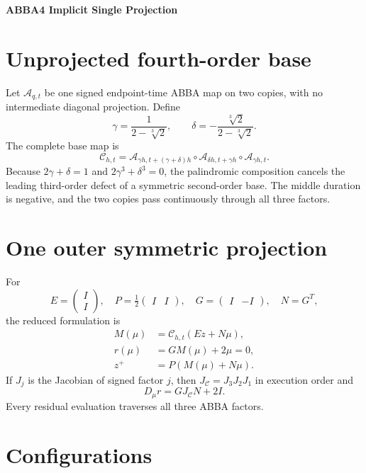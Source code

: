 \documentclass[11pt,a4paper]{article}
\begin{document}
\begin{center}
 {\LARGE\bfseries\color{gcblue}ABBA4 Implicit Single Projection}\par
 \vspace{0.35em}{\large One symmetric projection around an unprojected triple jump}
\end{center}

\section{Unprojected fourth-order base}

Let $\mathcal A_{q,t}$ be one signed endpoint-time ABBA map on two copies,
with no intermediate diagonal projection.  Define
\[
\gamma=\frac{1}{2-\sqrt[3]{2}},\qquad
\delta=-\frac{\sqrt[3]{2}}{2-\sqrt[3]{2}}.
\]
The complete base map is
\[
\mathcal C_{h,t}=
\mathcal A_{\gamma h,t+(\gamma+\delta)h}
\circ\mathcal A_{\delta h,t+\gamma h}
\circ\mathcal A_{\gamma h,t}.
\]
Because $2\gamma+\delta=1$ and $2\gamma^3+\delta^3=0$, the palindromic
composition cancels the leading third-order defect of a symmetric second-order
base.  The middle duration is negative, and the two copies pass continuously
through all three factors.

\section{One outer symmetric projection}

For
\[
E=\begin{pmatrix}I\\I\end{pmatrix},\quad
P=\tfrac12\begin{pmatrix}I&I\end{pmatrix},\quad
G=\begin{pmatrix}I&-I\end{pmatrix},\quad N=G^T,
\]
the reduced formulation is
\begin{align}
M(\mu)&=\mathcal C_{h,t}(Ez+N\mu),\\
r(\mu)&=GM(\mu)+2\mu=0,\\
z^+&=P(M(\mu)+N\mu).
\end{align}
If $J_j$ is the Jacobian of signed factor $j$, then
$J_\mathcal C=J_3J_2J_1$ in execution order and
\[
D_\mu r=GJ_\mathcal C N+2I.
\]
Every residual evaluation traverses all three ABBA factors.

\section{Configurations}
\end{document}
